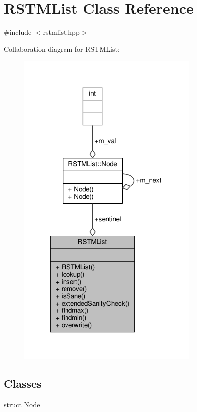 \hypertarget{classRSTMList}{\section{R\-S\-T\-M\-List Class Reference}
\label{classRSTMList}
}


{\ttfamily \#include $<$rstmlist.\-hpp$>$}



Collaboration diagram for R\-S\-T\-M\-List\-:
\nopagebreak
\begin{figure}[H]
\begin{center}
\leavevmode
\includegraphics[width=249pt]{classRSTMList__coll__graph}
\end{center}
\end{figure}
\subsection*{Classes}
\begin{DoxyCompactItemize}
\item 
struct \hyperlink{structRSTMList_1_1Node}{Node}
\end{DoxyCompactItemize}
